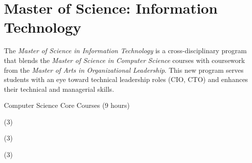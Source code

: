 \label{program:ms-it}%
\section*{Master of Science: Information Technology}

The \emph{Master of Science in Information Technology} is a cross-disciplinary program that blends the \emph{Master of Science in Computer Science} courses with coursework from the \emph{Master of Arts in Organizational Leadership}. This new program serves students with an eye toward technical leadership roles (CIO, CTO) and enhances their technical and managerial skills.

\begin{reqgroup}{Computer Science Core Courses (9 hours)}
\begin{checklist}
\begin{minipage}[t]{0.5\linewidth}
	\item (3) 
	\item (3) 
	
\end{minipage}
\begin{minipage}[t]{0.5\linewidth}
	\item (3) 
\end{minipage}
\end{checklist}
\end{reqgroup}
\vspace{0.25em}


